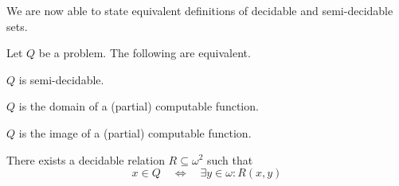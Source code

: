 We are now able to state equivalent definitions of decidable and semi-decidable
sets.

\begin{pro}\label{pro:characterizations of ce sets}
  Let \(Q\) be a problem. The following are equivalent.
  \begin{thmlist}
    \item \(Q\) is semi-decidable.
    \item \(Q\) is the domain of a (partial) computable function.
    \item \(Q\) is the image of a (partial) computable function.
    \item There exists a decidable relation \(R \subseteq ω^2\) such that
    \[
      x ∈ Q \quad ⇔ \quad ∃ y ∈ ω : R(x, y)
    \]
  \end{thmlist}
\end{pro}
